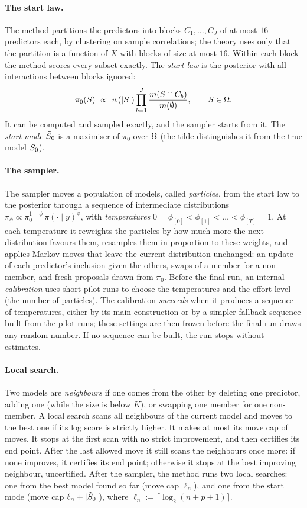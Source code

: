 \paragraph{The start law.} The method partitions the predictors into blocks $C_1,\dots,C_J$ of at most $16$ predictors
each, by clustering on sample correlations; the theory uses only that the partition is a function of $X$ with blocks of
size at most $16$. Within each block the method scores every subset exactly. The \emph{start law} is the posterior with
all interactions between blocks ignored:
\begin{equation}\label{eq:startlaw}
  \pi_0(S)\ \propto\ w(\lvert S\rvert)\prod_{b=1}^{J}\frac{m(S\cap C_b)}{m(\emptyset)},\qquad S\in\Omega.
\end{equation}
It can be computed and sampled exactly, and the sampler starts from it. The \emph{start mode} $\tilde S_0$ is a maximiser of
$\pi_0$ over $\Omega$ (the tilde distinguishes it from the true model $S_0$).

\paragraph{The sampler.} The sampler moves a population of models, called \emph{particles}, from the start law to the
posterior through a sequence of intermediate distributions $\pi_\phi\propto\pi_0^{1-\phi}\,\pi(\cdot\mid y)^{\phi}$, with
\emph{temperatures} $0=\phi_{[0]}<\phi_{[1]}<\dots<\phi_{[T]}=1$. At each temperature it reweights the particles by how much more the
next distribution favours them, resamples them in proportion to these weights, and applies Markov moves that leave the
current distribution unchanged: an update of each predictor's inclusion given the others, swaps of a member for a
non-member, and fresh proposals drawn from $\pi_0$. Before the final run, an internal \emph{calibration} uses short pilot
runs to choose the temperatures and the effort level (the number of particles). The calibration \emph{succeeds} when it
produces a sequence of temperatures, either by its main construction or by a simpler fallback sequence built from the
pilot runs; these settings are then frozen before the final run draws any random number. If no sequence can be built,
the run stops without estimates.

\paragraph{Local search.} Two models are \emph{neighbours} if one comes from the other by deleting one predictor, adding
one (while the size is below $K$), or swapping one member for one non-member. A local search scans all neighbours of the
current model and moves to the best one if its log score is strictly higher. It makes at most its move cap of moves. It
stops at the first scan with no strict improvement, and then certifies its end point. After the last allowed move it
still scans the neighbours once more: if none improves, it certifies its end point; otherwise it stops at the best
improving neighbour, uncertified. After the sampler, the method runs two local
searches: one from the best model found so far (move cap $\ell_n$), and one from the start mode (move cap
$\ell_n+\lvert \tilde S_0\rvert$), where $\ell_n:=\lceil\log_2(n+p+1)\rceil$.

